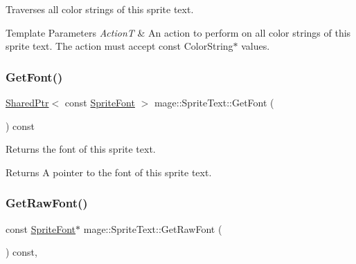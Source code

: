 Traverses all color strings of this sprite text.


\begin{DoxyTemplParams}{Template Parameters}
{\em ActionT} & An action to perform on all color strings of this sprite text. The action must accept {\ttfamily const} {\ttfamily Color\+String$\ast$} values. \\
\hline
\end{DoxyTemplParams}
\hypertarget{classmage_1_1_sprite_text_aa1aab1690f37220babce2639463bd7d5}{}\label{classmage_1_1_sprite_text_aa1aab1690f37220babce2639463bd7d5} 
\subsubsection{\texorpdfstring{Get\+Font()}{GetFont()}}
{\footnotesize\ttfamily \hyperlink{namespacemage_a1e01ae66713838a7a67d30e44c67703e}{Shared\+Ptr}$<$ const \hyperlink{classmage_1_1_sprite_font}{Sprite\+Font} $>$ mage\+::\+Sprite\+Text\+::\+Get\+Font (\begin{DoxyParamCaption}{ }\end{DoxyParamCaption}) const\hspace{0.3cm}{\ttfamily [noexcept]}}

Returns the font of this sprite text.

\begin{DoxyReturn}{Returns}
A pointer to the font of this sprite text. 
\end{DoxyReturn}
\hypertarget{classmage_1_1_sprite_text_ab3124ee856ef6da31745af152840a8ce}{}\label{classmage_1_1_sprite_text_ab3124ee856ef6da31745af152840a8ce} 
\subsubsection{\texorpdfstring{Get\+Raw\+Font()}{GetRawFont()}}
{\footnotesize\ttfamily const \hyperlink{classmage_1_1_sprite_font}{Sprite\+Font}$\ast$ mage\+::\+Sprite\+Text\+::\+Get\+Raw\+Font (\begin{DoxyParamCaption}{ }\end{DoxyParamCaption}) const\hspace{0.3cm}{\ttfamily [protected]}, {\ttfamily [noexcept]}}

